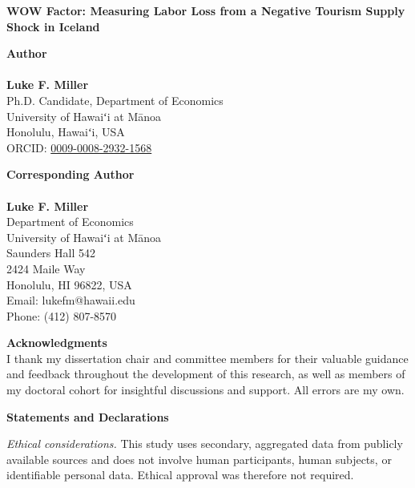 \documentclass[12pt]{article}
\begin{document}
\begin{center}
{\Large\textbf{WOW Factor: Measuring Labor Loss from a Negative Tourism Supply Shock in Iceland}}
\end{center}

\vspace{1em}

\noindent
\textbf{Author} \\
\\
\noindent
\textbf{Luke F. Miller} \\
Ph.D. Candidate, Department of Economics \\
University of Hawaiʻi at Mānoa \\
Honolulu, Hawaiʻi, USA \\
ORCID: \href{https://orcid.org/0009-0008-2932-1568}{0009-0008-2932-1568}

\vspace{1em}

\noindent
\textbf{Corresponding Author} \\
\\
\noindent
\textbf{Luke F. Miller} \\
Department of Economics \\
University of Hawaiʻi at Mānoa \\
Saunders Hall 542 \\
2424 Maile Way \\
Honolulu, HI 96822, USA \\
Email: lukefm@hawaii.edu \\
Phone: (412) 807-8570

\vspace{1em}

\noindent
\textbf{Acknowledgments} \\

I thank my dissertation chair and committee members for their valuable guidance and feedback throughout the development of this research, as well as members of my doctoral cohort for insightful discussions and support. All errors are my own.

\vspace{1em}

\noindent
\textbf{Statements and Declarations}

\vspace{0.5em}

\noindent
\textit{Ethical considerations.} This study uses secondary, aggregated data from publicly available sources and does not involve human participants, human subjects, or identifiable personal data. Ethical approval was therefore not required.
\end{document}
